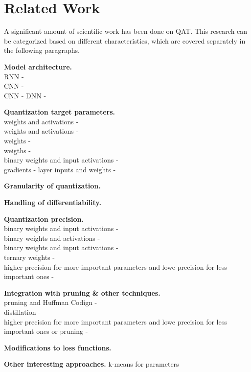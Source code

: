 \chapter{Related Work\label{cha:chapter5}}

A significant amount of scientific work has been done on QAT. 
This research can be categorized based on different characteristics, 
which are covered separately in the following paragraphs.

\noindent
\textbf{Model architecture.}\\
RNN - \cite{ott2016rnn}\\
CNN - \cite{rastegari2016xnor}\\
CNN - \cite{courbariaux2015binaryconnect}
DNN - \cite{yunchao2014compressing}

\noindent
\textbf{Quantization target parameters.}\\
weights and activations - \cite{krishnamoorthi2018quantizing}\\
weights and activations - \cite{hubara2016qnn}\\
weights - \cite{polino2018modelcompression}\\
weigths - \cite{ott2016rnn}\\
binary weights and input activations - \cite{rastegari2016xnor}\\
gradients - \cite{shuchang2016dorafenet}
layer inputs and weights - \cite{Edouard2022SPIQ} 

\noindent
\textbf{Granularity of quantization.}

\noindent
\textbf{Handling of differentiability.}

\noindent
\textbf{Quantization precision.}\\
binary weights and input activations - \cite{courbariaux2015binaryconnect}\\
binary weights and activations - \cite{hubara2016qnn}\\
binary weights and input activations - \cite{rastegari2016xnor}\\
ternary weights - \cite{ott2016rnn}\\
higher precision for more important parameters and lowe precision for less important ones - \cite{soroosh2018adaptive}

\noindent
\textbf{Integration with pruning \& other techniques.}\\
pruning and Huffman Codign - \cite{han2016deepcompression}\\
distillation - \cite{polino2018modelcompression}\\
higher precision for more important parameters and lowe precision for less important ones or pruning - \cite{soroosh2018adaptive}

\noindent
\textbf{Modifications to loss functions.}

\noindent
\textbf{Other interesting approaches.}
k-means for parameters \cite{yunchao2014compressing}
